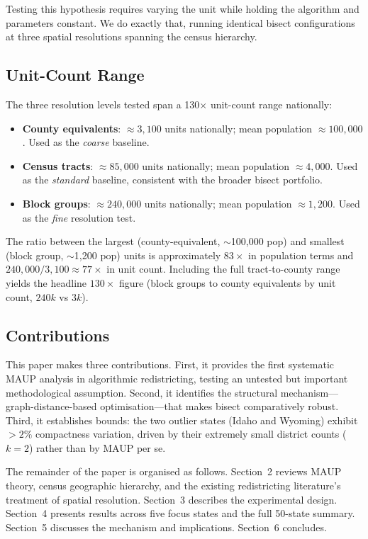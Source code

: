 Testing this hypothesis requires varying the unit while holding the algorithm
and parameters constant.  We do exactly that, running identical bisect
configurations at three spatial resolutions spanning the census hierarchy.

\subsection{Unit-Count Range}

The three resolution levels tested span a 130$\times$ unit-count range
nationally:

\begin{itemize}
  \item \textbf{County equivalents}: $\approx 3{,}100$ units nationally;
        mean population $\approx 100{,}000$.  Used as the \emph{coarse}
        baseline.
  \item \textbf{Census tracts}: $\approx 85{,}000$ units nationally;
        mean population $\approx 4{,}000$.  Used as the \emph{standard}
        baseline, consistent with the broader bisect portfolio.
  \item \textbf{Block groups}: $\approx 240{,}000$ units nationally;
        mean population $\approx 1{,}200$.  Used as the \emph{fine}
        resolution test.
\end{itemize}

The ratio between the largest (county-equivalent, $\sim$100,000 pop) and
smallest (block group, $\sim$1,200 pop) units is approximately $83\times$ in
population terms and $240{,}000 / 3{,}100 \approx 77\times$ in unit count.
Including the full tract-to-county range yields the headline $130\times$
figure (block groups to county equivalents by unit count, $240k$ vs $3k$).

\subsection{Contributions}

This paper makes three contributions.  First, it provides the first
systematic MAUP analysis in algorithmic redistricting, testing an untested
but important methodological assumption.  Second, it identifies the
structural mechanism---graph-distance-based optimisation---that makes bisect
comparatively robust.  Third, it establishes bounds: the two outlier states
(Idaho and Wyoming) exhibit $>2\%$ compactness variation, driven by their
extremely small district counts ($k = 2$) rather than by MAUP per se.

The remainder of the paper is organised as follows.  Section~2 reviews MAUP
theory, census geographic hierarchy, and the existing redistricting
literature's treatment of spatial resolution.  Section~3 describes the
experimental design.  Section~4 presents results across five focus states and
the full 50-state summary.  Section~5 discusses the mechanism and
implications.  Section~6 concludes.
